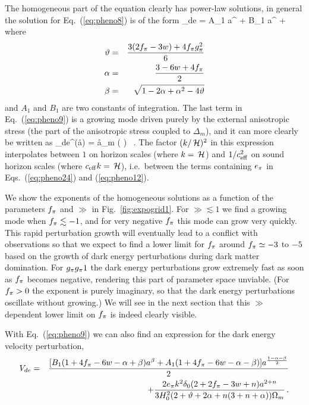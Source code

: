 The homogeneous part of the equation clearly has power-law solutions, in general the solution for Eq.\ (\ref{eq:pheno8}) is of the form
\be 
\delta_{de} = A_1 a^{} + B_1 a^{} +  
\label{eq:pheno9}
\ee
where 
\begin{eqnarray}
\vartheta & = & \frac{3 (2 \ff - 3 w)  + 4 \ff \gg^2 }{6}   \\
\alpha & = & \frac{3 - 6 w + 4 \ff}{2}\\ 
\beta & = &  \sqrt{1-2\alpha + \alpha^2 -4 \vartheta }
\label{eq:pheno10}
\end{eqnarray}
and $ A_1 $ and $ B_1 $ are two constants of integration. The last term in Eq.\ (\ref{eq:pheno9}) is a growing mode driven purely by the external anisotropic stress (the part of the anisotropic stress coupled to $\Delta_m$), and it can more clearly be written as
\be
\delta_{de}^{(\aa)} = 
\aa \delta_m \left( \right)  \, .
\ee
The factor $(k/\H)^2$ in this expression interpolates between $1$ on horizon scales (where $k=\H$) and $1/\ceff^2$ on sound horizon scales (where $\ceff k = \H$), i.e.\ between the terms containing $\aa$ in Eqs.\ (\ref{eq:pheno24}) and (\ref{eq:pheno12}).

We show the exponents of the homogeneous solutions as a function of the parameters $\ff$ and $\gg$ in Fig.\ \ref{fig:expogrid1}. For $\gg \lesssim 1$ we find a growing mode when $\ff \lesssim -1$, and for very negative $\ff$ this mode can grow very quickly. This rapid perturbation growth will eventually lead to a conflict with observations so that we expect to find a lower limit for $\ff$ around $\ff \simeq -3$ to $-5$ based on the growth of dark energy perturbations during dark matter domination. For $\gg \mug 1$ the dark energy perturbations grow extremely fast as soon as $\ff$ becomes negative, rendering this part of parameter space unviable. (For $\ff>0$ the exponent is purely imaginary, so that the dark energy perturbations oscillate without growing.) We will see in the next section that this $\gg$ dependent lower limit on $\ff$ is indeed clearly visible.

With Eq.\ (\ref{eq:pheno9}) we can also find an expression for the dark energy velocity perturbation,   
\begin{eqnarray} 
V_{de} & = & \frac{[B_1 (1+ 4\ff - 6w - \alpha + \beta) a^\beta + A_1 (1+4\ff -6w-\alpha - \beta) ] a^{\frac{1-\alpha - \beta}{2}} }{2} \nonumber \\
&&+ \frac{2 \aa k^2 \delta_0 (2+2\ff -3w + n)a^{2+n}}{3 H_0^2 (2+\vartheta + 2\alpha +n(3+n+\alpha))\Omega_m} \, .
\label{eq:pheno9b}
\end{eqnarray}

